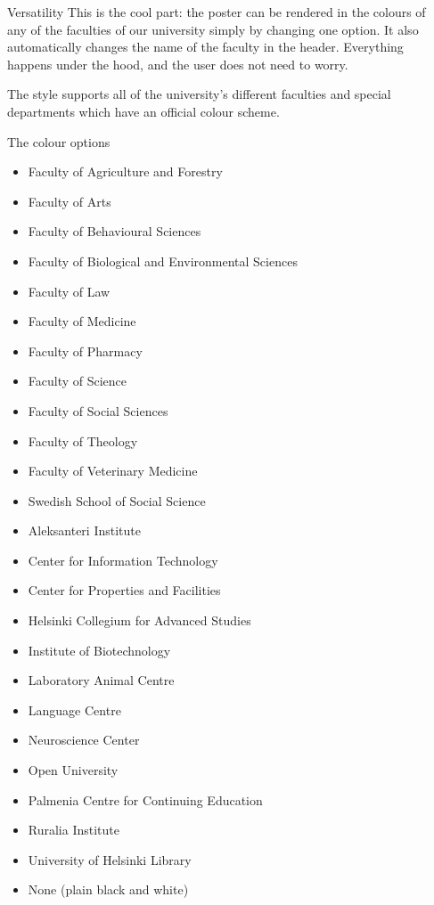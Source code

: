 \documentclass[final]{beamer}
\begin{document}
\begin{frame}[t, fragile]
\begin{columns}[T]
\begin{column}{0.32\linewidth}
\end{column}

\begin{column}{0.32\linewidth}

\begin{block}{Versatility}
This is the cool part: the poster can be rendered in the colours of any of the faculties of our university simply by changing one option. It also automatically changes the name of the faculty in the header. Everything happens under the hood, and the user does not need to worry.

The style supports all of the university's different faculties and special departments which have an official colour scheme.
\end{block}

\begin{block}{The colour options}
\begin{itemize}
\item Faculty of Agriculture and Forestry 
\item Faculty of Arts 
\item Faculty of Behavioural Sciences 
\item Faculty of Biological and Environmental Sciences 
\item Faculty of Law 
\item Faculty of Medicine 
\item Faculty of Pharmacy 
\item Faculty of Science 
\item Faculty of Social Sciences 
\item Faculty of Theology 
\item Faculty of Veterinary Medicine 
\item Swedish School of Social Science
\item Aleksanteri Institute
\item Center for Information Technology
\item Center for Properties and Facilities
\item Helsinki Collegium for Advanced Studies
\item Institute of Biotechnology
\item Laboratory Animal Centre
\item Language Centre
\item Neuroscience Center
\item Open University
\item Palmenia Centre for Continuing Education
\item Ruralia Institute
\item University of Helsinki Library
\item None (plain black and white)
\end{itemize}
\end{block}


\end{column}
\end{columns}
\end{frame}
\end{document}
